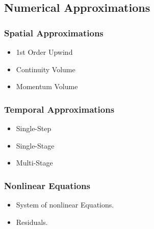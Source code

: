 \documentclass[compress]{beamer}
\begin{document}
\subsection[Numeric Approximation]{Numerical Approximations}
\begin{frame}
\frametitle{Spatial Approximations}

\begin{itemize}
\item{1st Order Upwind}
\item{Continuity Volume}
\item{Momentum Volume}
\end{itemize}

\end{frame}
\begin{frame}
\frametitle{Temporal Approximations}

\begin{itemize}
\item{Single-Step}
\item{Single-Stage}
\item{Multi-Stage}
\end{itemize}

\end{frame}
\begin{frame}
\frametitle{Nonlinear Equations}

\begin{itemize}
\item{System of nonlinear Equations.}
\item{Residuals.}
\end{itemize}

\end{frame}
\end{document}
